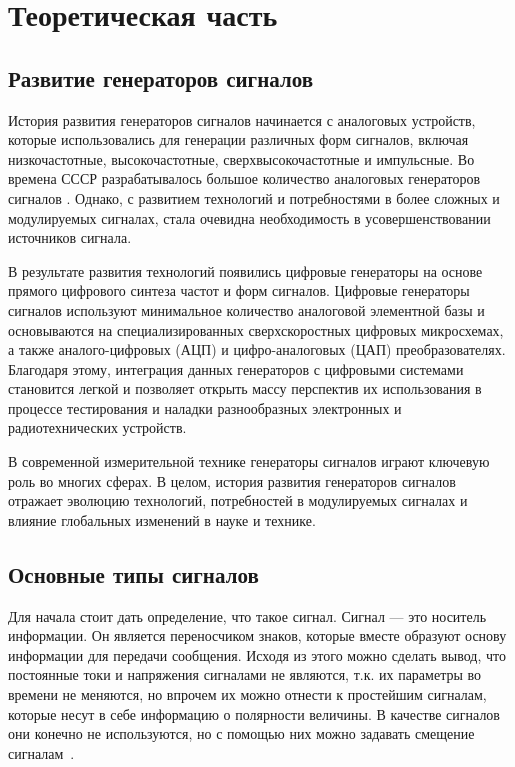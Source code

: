 \chapter{Теоретическая часть}

\section{Развитие генераторов сигналов}
	История развития генераторов сигналов начинается с аналоговых устройств, которые
использовались для генерации различных форм сигналов, включая низкочастотные,
высокочастотные, сверхвысокочастотные и импульсные. Во времена СССР разрабатывалось большое количество аналоговых генераторов сигналов \cite{dgs}. Однако, с развитием технологий и потребностями в более сложных и модулируемых сигналах, стала очевидна необходимость в усовершенствовании источников сигнала.

	В результате развития технологий появились цифровые генераторы на основе прямого цифрового синтеза частот и форм сигналов. Цифровые генераторы сигналов используют минимальное количество аналоговой элементной базы и основываются на специализированных сверхскоростных цифровых микросхемах, а также аналого-цифровых (АЦП) и цифро-аналоговых (ЦАП) преобразователях. Благодаря этому, интеграция данных генераторов с цифровыми системами становится легкой и позволяет открыть массу перспектив их использования в процессе тестирования и наладки разнообразных электронных и радиотехнических устройств. 

	В современной измерительной технике генераторы сигналов играют ключевую роль во многих сферах. %
	В целом, история развития генераторов сигналов отражает эволюцию технологий, потребностей в модулируемых сигналах и влияние глобальных изменений в науке и технике.

\section{Основные типы сигналов}
	Для начала стоит дать определение, что такое сигнал. Сигнал --- это носитель информации. Он является переносчиком знаков, которые вместе образуют основу информации для передачи сообщения. Исходя из этого можно сделать вывод, что постоянные токи и напряжения сигналами не являются, т.к. их параметры во времени не меняются, но впрочем их можно отнести к простейшим сигналам, которые несут в себе информацию о полярности величины. В качестве сигналов они конечно не используются, но с помощью них можно задавать смещение сигналам~\cite{dgs}.

